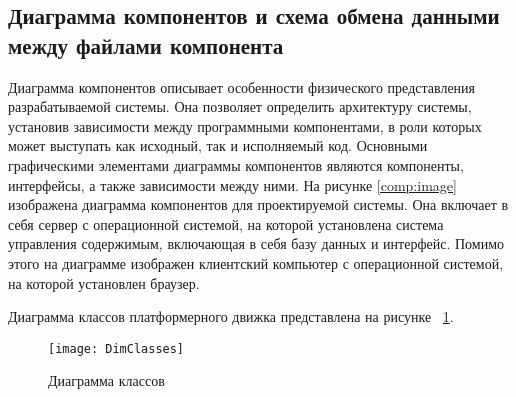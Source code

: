 \subsection{Диаграмма компонентов и схема обмена данными между файлами компонента}

Диаграмма компонентов описывает особенности физического представления разрабатываемой системы. Она позволяет определить архитектуру системы, установив зависимости между программными компонентами, в роли которых может выступать как исходный, так и исполняемый код. Основными графическими элементами диаграммы компонентов являются компоненты, интерфейсы, а также зависимости между ними. На рисунке \ref{comp:image} изображена диаграмма компонентов для проектируемой системы. Она включает в себя сервер с операционной системой, на которой установлена система управления содержимым, включающая в себя базу данных и интерфейс. Помимо этого на диаграмме изображен клиентский компьютер с операционной системой, на которой установлен браузер.

Диаграмма классов платформерного движка представлена на рисунке ~\ref{DimClasses:image}.
\begin{figure}[ht]
	\texttt{[image: DimClasses]}
	\caption{Диаграмма классов}
	\label{DimClasses:image}
\end{figure}

 
